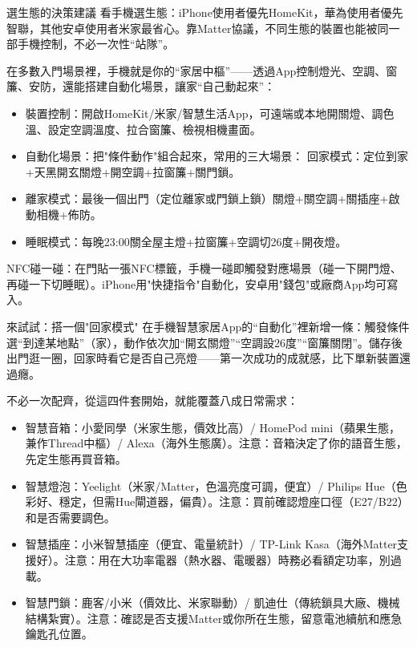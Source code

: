 \begin{tcbinfo}{選生態的決策建議}
看手機選生態：iPhone使用者優先HomeKit，華為使用者優先智聯，其他安卓使用者米家最省心。靠Matter協議，不同生態的裝置也能被同一部手機控制，不必一次性“站隊”。

\end{tcbinfo}


在多數入門場景裡，手機就是你的“家居中樞”——透過App控制燈光、空調、窗簾、安防，還能搭建自動化場景，讓家“自己動起來”：

\begin{itemize}
  \item 裝置控制：開啟HomeKit/米家/智慧生活App，可遠端或本地開關燈、調色溫、設定空調溫度、拉合窗簾、檢視相機畫面。
  \item 自動化場景：把"條件動作"組合起來，常用的三大場景： 回家模式：定位到家+天黑開玄關燈+開空調+拉窗簾+關門鎖。
  \item 離家模式：最後一個出門（定位離家或門鎖上鎖）關燈+關空調+關插座+啟動相機+佈防。
  \item 睡眠模式：每晚23:00關全屋主燈+拉窗簾+空調切26度+開夜燈。
\end{itemize}

NFC碰一碰：在門貼一張NFC標籤，手機一碰即觸發對應場景（碰一下開門燈、再碰一下切睡眠）。iPhone用"快捷指令"自動化，安卓用"錢包"或廠商App均可寫入。

\begin{tcbpractice}{來試試：搭一個"回家模式"}
在手機智慧家居App的“自動化”裡新增一條：觸發條件選“到達某地點”（家），動作依次加“開玄關燈”“空調設26度”“窗簾關閉”。儲存後出門逛一圈，回家時看它是否自己亮燈——第一次成功的成就感，比下單新裝置還過癮。

\end{tcbpractice}


不必一次配齊，從這四件套開始，就能覆蓋八成日常需求：

\begin{itemize}
  \item 智慧音箱：小愛同學（米家生態，價效比高）/ HomePod mini（蘋果生態，兼作Thread中樞）/ Alexa（海外生態廣）。注意：音箱決定了你的語音生態，先定生態再買音箱。
  \item 智慧燈泡：Yeelight（米家/Matter，色溫亮度可調，便宜）/ Philips Hue（色彩好、穩定，但需Hue閘道器，偏貴）。注意：買前確認燈座口徑（E27/B22）和是否需要調色。
  \item 智慧插座：小米智慧插座（便宜、電量統計）/ TP-Link Kasa（海外Matter支援好）。注意：用在大功率電器（熱水器、電暖器）時務必看額定功率，別過載。
  \item 智慧門鎖：鹿客/小米（價效比、米家聯動）/ 凱迪仕（傳統鎖具大廠、機械結構紮實）。注意：確認是否支援Matter或你所在生態，留意電池續航和應急鑰匙孔位置。
\end{itemize}

